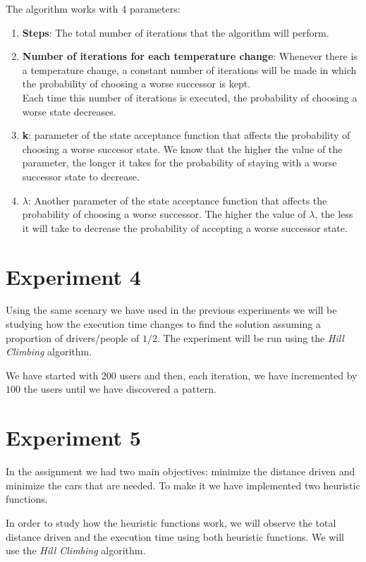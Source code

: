 \documentclass[12]{article}
\begin{document}
The algorithm works with 4 parameters:
\begin{enumerate}
\item \textbf{Steps}: The total number of iterations that the algorithm will perform. 
\item \textbf{Number of iterations for each temperature change}: Whenever there is a temperature change, a constant number of iterations will be made in which the probability of choosing a worse successor is kept. 
\\
Each time this number of iterations is executed, the probability of choosing a worse state decreases. 
\item \textbf{k}: parameter of the state acceptance function that affects the probability of choosing a worse succesor state. We know that the higher the value of the parameter, the longer it takes for the probability of staying with a worse successor state to decrease. 

\item \textbf{$\lambda$}: Another parameter of the state acceptance function that affects the probability of choosing a worse successor. The higher the value of $\lambda$, the less it will take to decrease the probability of accepting a worse successor state. 


\end{enumerate}

\section{Experiment 4}
Using the same scenary we have used in the previous experiments we will be studying how the execution time changes to find the solution  assuming a proportion of drivers/people of $1/2$. The experiment will be run using the     
 \textit{Hill Climbing} algorithm.

We have started with $200$ users and then, each iteration, we have incremented by $100$ the users until we have discovered a pattern.  




\section{Experiment 5}
In the assignment we had two main objectives: minimize the distance driven and minimize the cars that are needed. To make it we have implemented two heuristic functions. 

In order to study how the heuristic functions work, we will observe the total distance driven and the execution time using both heuristic functions. We will use the \textit{Hill Climbing} algorithm.
\end{document}

